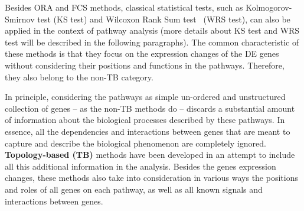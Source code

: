 \begin{itemize}
\end{itemize}

 

Besides ORA and FCS methods, classical statistical tests, such as Kolmogorov-Smirnov test \cite{massey1951kolmogorov} (KS test) and Wilcoxon Rank Sum test~\cite{wilcoxon1945individual} (WRS test), can also be applied in the context of pathway analysis (more details about KS test and WRS test will be described in the following paragraphs). 
The common characteristic of these methods is that they focus on the expression changes of the DE genes without considering their positions and functions in the pathways.
Therefore, they also belong to the non-TB category.

In principle, considering the pathways as simple un-ordered and unstructured collection of genes -- as the non-TB methods do -- discards a substantial amount of information about the biological processes described by these pathways. In essence, all the dependencies and interactions between genes that are meant to capture and describe the biological phenomenon are completely ignored. 
 \textbf{Topology-based (TB)} methods have been developed in an attempt to include all this additional information in the analysis.
Besides the genes expression changes, these methods  also take into consideration in various ways the positions and roles of all genes on each pathway, as well as all known signals and interactions between genes. 

